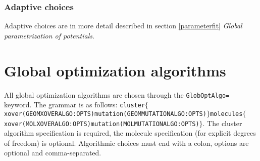 \documentclass[a4paper,10pt]{scrbook}
\begin{document}
\subsubsection{Adaptive choices}
Adaptive choices are in more detail described in section \ref{parameterfit}
\emph{Global parametrization of potentials}.

\section{Global optimization algorithms}
\label{sec:geomglobopt}
All global optimization algorithms are chosen through the \texttt{GlobOptAlgo=}
keyword. The grammar is as follows: 
\texttt{cluster$\{$xover(GEOMXOVERALGO:OPTS)mutation(GEOMMUTATIONALGO:OPTS)$\}
$molecules$\{$ xover(MOLXOVERALGO:OPTS)mutation(MOLMUTATIONALGO:OPTS)$\}$}.
The cluster algorithm specification is required, the molecule specification 
(for explicit degrees of freedom) is optional. Algorithmic choices must end 
with a colon, options are optional and comma-separated.
\end{document}
